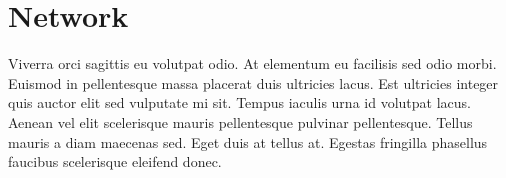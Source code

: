 \section{Network}
\label{sec:network}

Viverra orci sagittis eu volutpat odio. At elementum eu facilisis sed odio morbi. Euismod in pellentesque massa placerat duis ultricies lacus. Est ultricies integer quis auctor elit sed vulputate mi sit. Tempus iaculis urna id volutpat lacus. Aenean vel elit scelerisque mauris pellentesque pulvinar pellentesque. Tellus mauris a diam maecenas sed. Eget duis at tellus at. Egestas fringilla phasellus faucibus scelerisque eleifend donec.
